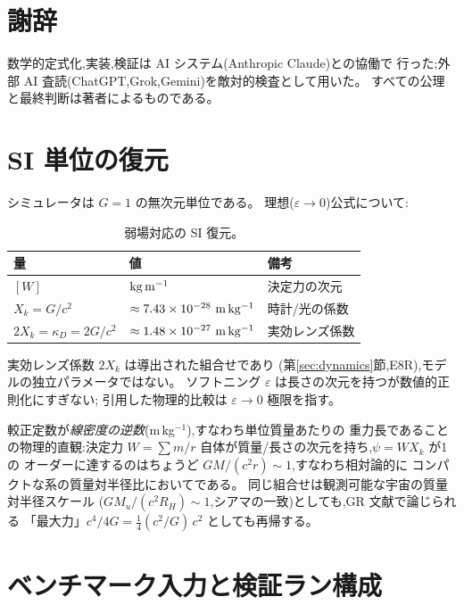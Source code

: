 \documentclass[a4paper,10pt,twocolumn]{ltjsarticle}
\newcommand{\Kt}{X_k}
\begin{document}
\section*{謝辞}
数学的定式化,実装,検証は AI システム(Anthropic Claude)との協働で
行った;外部 AI 査読(ChatGPT,Grok,Gemini)を敵対的検査として用いた。
すべての公理と最終判断は著者によるものである。

\appendix

\section{SI 単位の復元}
\label{app:si}

シミュレータは $G = 1$ の無次元単位である。
理想($\varepsilon \to 0$)公式について:

\begin{table}[h]
\caption{\label{tab:si}弱場対応の SI 復元。}
\centering
\small
\setlength{\tabcolsep}{4pt}%
\begin{tabular}{lp{}p{}}
\toprule
量 & 値 & 備考 \\
\midrule
$[W]$ & ${\rm kg\,m^{-1}}$ & 決定力の次元 \\
$\Kt = G/c^2$ & $\approx 7.43\times10^{-28}\ {\rm m\,kg^{-1}}$ &
時計/光の係数 \\
$2\Kt = \kappa_D = 2G/c^2$ & $\approx 1.48\times10^{-27}\ {\rm m\,kg^{-1}}$ &
実効レンズ係数 \\
\bottomrule
\end{tabular}
\end{table}

実効レンズ係数 $2\Kt$ は導出された組合せであり
(第\ref{sec:dynamics}節,E8R),モデルの独立パラメータではない。
ソフトニング $\varepsilon$ は長さの次元を持つが数値的正則化にすぎない;
引用した物理的比較は $\varepsilon \to 0$ 極限を指す。

較正定数が\emph{線密度の逆数}(m\,kg$^{-1}$),すなわち単位質量あたりの
重力長であることの物理的直観:決定力
$W = \sum m/r$ 自体が質量/長さの次元を持ち,$\psi = W\Kt$ が1の
オーダーに達するのはちょうど $GM/(c^2 r) \sim 1$,すなわち相対論的に
コンパクトな系の質量対半径比においてである。
同じ組合せは観測可能な宇宙の質量対半径スケール
($GM_u/(c^2R_H) \sim 1$,シアマの一致)としても,GR 文献で論じられる
「最大力」$c^4/4G = \tfrac14(c^2/G)\,c^2$ としても再帰する。

\section{ベンチマーク入力と検証ラン構成}
\label{app:inputs}
\end{document}

